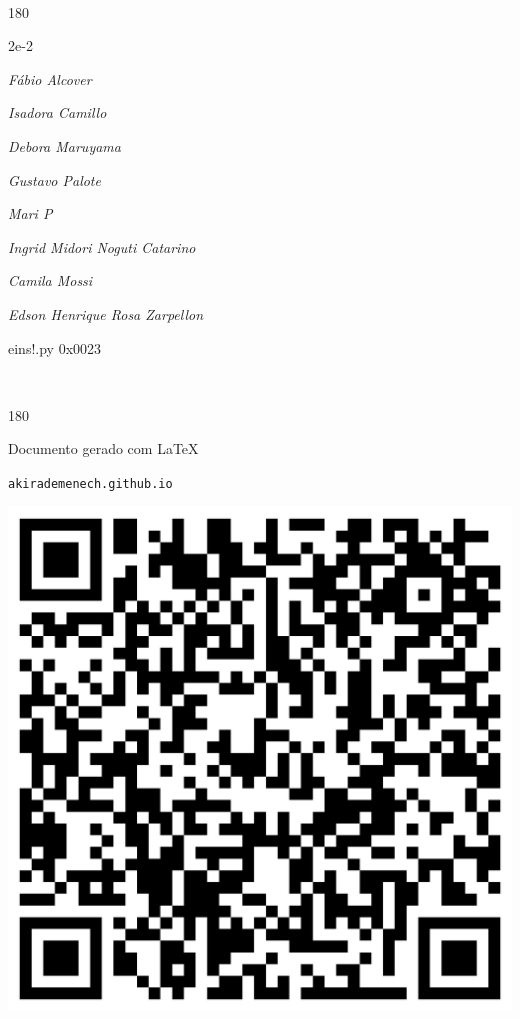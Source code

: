 \documentclass[12pt]{article}
\begin{document}
	\ 
	\vfill
	\begin{turn}{180}	
		\begin{minipage}{\textwidth}
		  	\ttfamily %
			\centering
			{\Huge 2e-2}
		  
			\hfill
		  
			

\textit{\small Fábio Alcover}

\textit{\small Isadora Camillo}

\textit{\small Debora Maruyama}

\textit{\small Gustavo Palote}

\textit{\small Mari P}

\textit{\small Ingrid Midori Noguti Catarino}

\textit{\small Camila Mossi}

\textit{\small Edson Henrique Rosa Zarpellon}

\bigskip

eins!.py
0x0023


		\end{minipage}	
	\end{turn}
	\vfill
	\

\pagebreak

	\begin{turn}{180}	
		\begin{minipage}{\textwidth}		  
		  Documento gerado com \LaTeX			
		  
		  \texttt{akirademenech.github.io}

		  \includegraphics[height=0.3\textheight]{2e-2.pdf}

		\end{minipage}	
	\end{turn}  
		  
\end{document}
